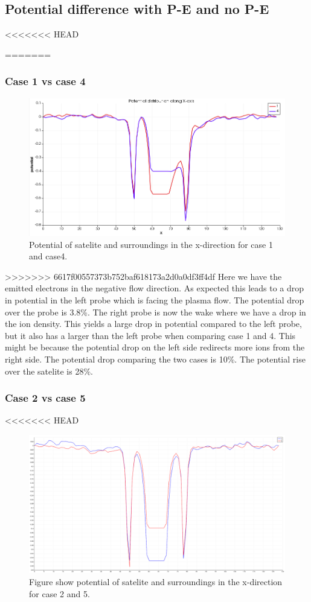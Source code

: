 \subsection{Potential difference with P-E and no P-E}

<<<<<<< HEAD


=======



\subsubsection{Case 1 vs case 4}

\begin{figure}
    \includegraphics[width = 0.3 \textwidth]{images/pot_case14.png}
    \caption{Potential of satelite and surroundings in the x-direction for case 1 and case4.}
\end{figure}


>>>>>>> 6617f00557373b752baf618173a2d0a0df3ff4df
Here we have the emitted electrons in the negative flow direction. As expected this
leads to a drop in potential in the left probe which is facing the plasma flow. The
potential drop over the probe is 3.8\%. The right probe is now the wake where we have
a drop in the ion density. This yields a large drop in potential compared to the left
probe, but it also has a larger than the left probe when comparing case 1 and 4. This
might be because the potential drop on the left side redirects more ions from the right side.
The potential drop comparing the two cases is 10\%. The potential rise over the satelite is 28\%.


\subsubsection{Case 2 vs case 5}

<<<<<<< HEAD
\begin{figure}
    \includegraphics[width = 0.5 \textwidth]{images/pot_case25.png}
    \caption{Figure show potential of satelite and surroundings in the x-direction for case 2 and 5.}
\end{figure}

